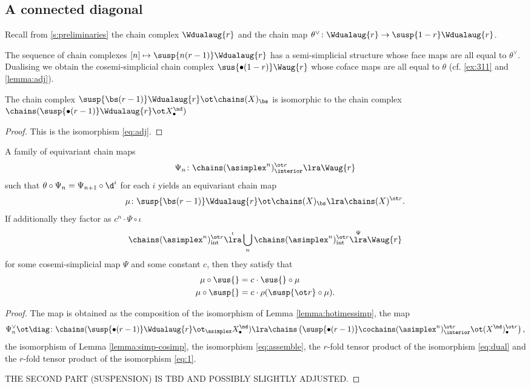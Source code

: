\subsection{A connected diagonal}

Recall from \cref{s:preliminaries} the chain complex $\Wdualaug{r}$ and the chain map $\theta^\vee\colon \Wdualaug{r}\to \susp{1-r}\Wdualaug{r}$.

\begin{definition} The sequence of chain complexes $[n]\mapsto \susp{n(r-1)}\Wdualaug{r}$ has a semi-simplicial structure whose face maps are all equal to $\theta^\vee$. Dualising we obtain the cosemi-simplicial chain complex $\sus{\bullet(1-r)}\Waug{r}$ whose coface maps are all equal to $\theta$ (cf. \cref{ex:311} and \cref{lemma:adj}).
\end{definition}

\begin{lemma}\label{lemma:hotimessimp}
	The chain complex $\susp{\bs(r-1)}\Wdualaug{r}\ot \chains(X)_\bs$ is isomorphic to the chain complex $\chains(\susp{\bullet(r-1)}\Wdualaug{r} \ot X^\nd_\bullet)$
\end{lemma}
\begin{proof}
	This is the isomorphism \eqref{eq:adj}.
\end{proof}


\begin{corollary}
	A family of equivariant chain maps 
	\[
	\Psi_n\colon \chains(\asimplex^{n})^{\ot r}_\interior \lra \Waug{r}
	\]
	such that $\theta\circ \Psi_n =  \Psi_{n+1} \circ \d^i$ for each $i$ yields an equivariant chain map
	\[
	\mu\colon \susp{\bs(r-1)}\Wdualaug{r}\ot \chains(X)_\bs\lra \chains(X)^{\ot r}.
	\]
	If additionally they factor as $c^n\cdot \Psi\circ \iota$
	\[
		\chains(\asimplex^n)^{\ot r}_{\mathrm{\mathrm{int}}}\overset{\iota}{\lra} \bigcup_n\chains(\asimplex^n)^{\ot r}_{\mathrm{int}} \overset{\Psi}{\lra} \Waug{r}
	\]
	for some cosemi-simplicial map $\Psi$ and some constant $c$,
	then they satisfy that 
	\begin{align*}
		\mu\circ \sus{} &= c\cdot \sus{}\circ \mu
		\\
		\mu\circ \susp{} &= c\cdot \rho(\susp{\ot r}\circ \mu).
	\end{align*}
\end{corollary}
\begin{proof}
	The map is obtained as the composition of the isomorphism of Lemma \ref{lemma:hotimessimp}, the map 
	\[
		\Psi_n^\vee\ot \diag\colon \chains(\susp{\bullet(r-1)}\Wdualaug{r} \ot_{\asimplex} X^{\nd}_\bullet) 
		\lra
		\chains\left(\susp{\bullet(r-1)}\cochains(\asimplex^n)^{\ot r}_\interior\ot (X^{\nd})^{\ot r}_\bullet\right),	
	\]
	the isomorphism of Lemma \ref{lemma:simp-cosimp}, the isomorphism \eqref{eq:assemble}, the $r$-fold tensor product of the isomorphism \eqref{eq:dual} and the $r$-fold tensor product of the isomorphism \eqref{eq:1}.
	
	THE SECOND PART (SUSPENSION) IS TBD AND POSSIBLY SLIGHTLY ADJUSTED.
\end{proof}

